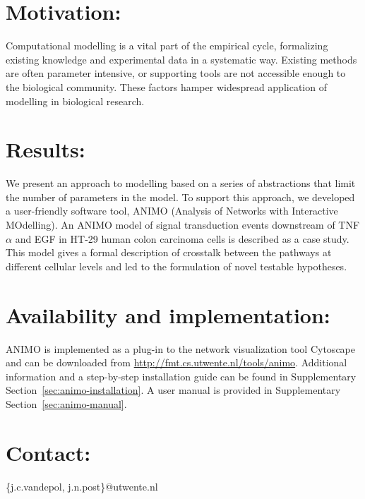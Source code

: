 \section{Motivation:}
Computational modelling is a vital part of the empirical cycle,
formalizing existing knowledge and experimental data in a systematic way.
Existing methods are often parameter intensive, or supporting tools are
not accessible enough to the biological community. These factors
hamper widespread application of modelling in biological research.
\section{Results:}
We present an approach to modelling based on a series of
abstractions that limit the number of parameters in the model.
To support this approach, we developed a user-friendly software tool,
ANIMO (Analysis of Networks with Interactive MOdelling).
An ANIMO model of signal transduction events downstream of TNF$\alpha$
and EGF in HT-29 human colon carcinoma cells is described as a case study.
This model gives a formal description of crosstalk between the pathways at
different cellular levels and led to the formulation of novel testable hypotheses.
\section{Availability and implementation:}
ANIMO is implemented as a plug-in to the network visualization tool Cytoscape
and can be downloaded from \url{http://fmt.cs.utwente.nl/tools/animo}.
Additional information and a step-by-step installation guide can be found
in Supplementary Section~\ref{sec:animo-installation}. A user manual is 
provided in Supplementary Section~\ref{sec:animo-manual}.
\section{Contact:} \{j.c.vandepol, j.n.post\}@utwente.nl
